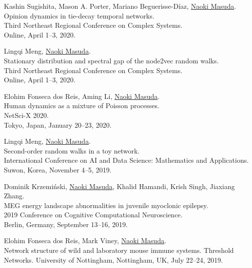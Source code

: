 \documentclass[11pt,letter]{article}
\begin{document}
\begin{etaremune}
\item Kashin Sugishita, Mason A. Porter, Mariano Beguerisse-D\'{i}az, \underline{Naoki Masuda}.\\
Opinion dynamics in tie-decay temporal networks.\\
Third Northeast Regional Conference on Complex Systems.\\
Online, April 1--3, 2020.

\item Lingqi Meng, \underline{Naoki Masuda}.\\
Stationary distribution and spectral gap of the node2vec random walks.\\
Third Northeast Regional Conference on Complex Systems.\\
Online, April 1--3, 2020.

\item Elohim Fonseca dos Reis, Aming Li, \underline{Naoki Masuda}.\\
Human dynamics as a mixture of Poisson processes.\\
NetSci-X 2020.\\
Tokyo, Japan, January 20--23, 2020.

\item Lingqi Meng, \underline{Naoki Masuda}.\\
Second-order random walks in a toy network.\\
International Conference on AI and Data Science: Mathematics and Applications.\\
Suwon, Korea, November 4--5, 2019.

\item Dominik Krzemi\'{n}ski, \underline{Naoki Masuda}, Khalid Hamandi, Krish Singh, Jiaxiang Zhang.\\
MEG energy landscape abnormalities in juvenile myoclonic epilepsy.\\
2019 Conference on Cognitive Computational Neuroscience.\\
Berlin, Germany, September 13--16, 2019.

\item Elohim Fonseca dos Reis, Mark Viney, \underline{Naoki Masuda}.\\
Network structure of wild and laboratory mouse immune systems.
Threshold Networks. University of Nottingham, Nottingham, UK, July 22--24, 2019.


\end{etaremune}
\end{document}
